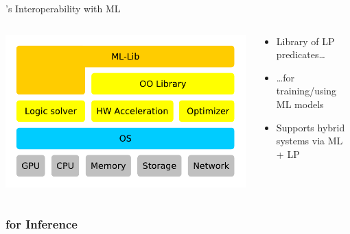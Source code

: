 \documentclass[presentation]{beamer}\mode<presentation>{\usetheme{AMSBolognaFC}}
\begin{document}
\begin{frame}{\twopkt{}'s Interoperability with ML}
    \begin{columns}
        \begin{column}{.35\linewidth}
            \includegraphics[width=\linewidth]{figures/layers.pdf}
        \end{column}
        \begin{column}{.65\linewidth}
            \begin{itemize}
                \item \alert{Library} of LP predicates\ldots
                \item \ldots for \alert{training/using} ML models
                \item Supports hybrid systems via \alert{ML + LP}
            \end{itemize}
        \end{column}
    \end{columns}
\end{frame}

\subsubsection{\twopkt{} for Inference}
\end{document}
